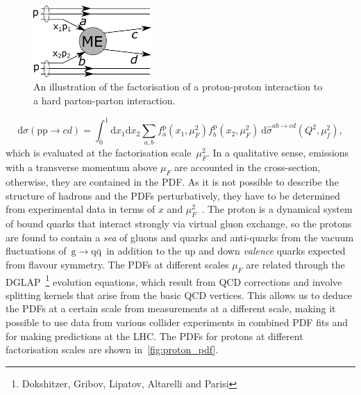 \begin{figure}
\begin{centering}
\includegraphics[width=0.4\textwidth]{figures/theory/factorization.pdf}
\caption[An illustration of the factorisation of a proton-proton interaction]{An illustration of the factorisation of a proton-proton interaction to a hard parton-parton interaction.}
\label{fig:theory_pdf_factorisation}
\end{centering}
\end{figure}

\begin{equation}
\label{eq:theory_pdf_factorisation}
\mathrm{d}\sigma(\mathrm{p}\mathrm{p} \rightarrow cd) = \int_0^1 \mathrm{d}x_1 \mathrm{d}x_2 \sum_{a,b} f_a^{\mathrm{p}}(x_1, \mu_F^2) f_b^{\mathrm{p}}(x_2, \mu_F^2)\ \mathrm{d}\hat{\sigma}^{ab \rightarrow cd} (Q^2, \mu_f^2),
\end{equation}
which is evaluated at the factorisation scale~$\mu_F^2$. In a qualitative sense, emissions with a transverse momentum above $\mu_F$ are accounted in the cross-section, otherwise, they are contained in the PDF. As it is not possible to describe the structure of hadrons and the PDFs perturbatively, they have to be determined from experimental data in terms of $x$ and $\mu_F^2$~\cite{Diemoz:1987xu,Ball:2014uwa}. The proton is a dynamical system of bound quarks that interact strongly via virtual gluon exchange, so the protons are found to contain a \textit{sea} of gluons and quarks and anti-quarks from the vacuum fluctuations of~$\mathrm{g} \rightarrow \mathrm{q} \bar{\mathrm{q}}$~in addition to the up and down \textit{valence} quarks expected from flavour symmetry. The PDFs at different scales $\mu_F$ are related through the DGLAP~\cite{Altarelli:1977zs,Dokshitzer:1977sg,Gribov:1972ri}\footnote{Dokshitzer, Gribov, Lipatov, Altarelli and Parisi} evolution equations, which result from QCD corrections and involve splitting kernels that arise from the basic QCD vertices. This allows us to deduce the PDFs at a certain scale from measurements at a different scale, making it possible to use data from various collider experiments in combined PDF fits and for making predictions at the LHC. The PDFs for protons at different factorisation scales are shown in~\cref{fig:proton_pdf}.

